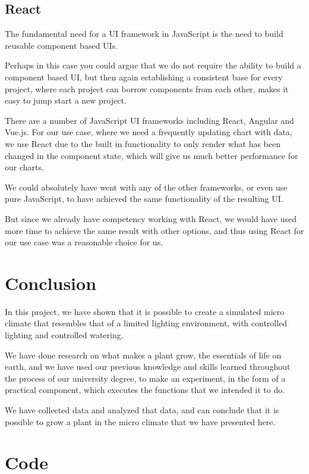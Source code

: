 \documentclass[a4paper,12pt,twoside,openright,titlepage]{book}
\begin{document}
\section{React}
The fundamental need for a UI framework in JavaScript is the need to build reusable component based UIs.

Perhaps in this case you could argue that we do not require the ability to build a component based UI, but then again establishing a consistent base for every project, where each project can borrow components from each other, makes it easy to jump start a new project.

There are a number of JavaScript UI frameworks including React, Angular and Vue.js.
For our use case, where we need a frequently updating chart with data, we use React due to the built in functionality to only render what has been changed in the component state, which will give us much better performance for our charts.

We could absolutely have went with any of the other frameworks, or even use pure JavaScript, to have achieved the same functionality of the resulting UI.

But since we already have competency working with React, we would have used more time to achieve the same result with other options, and thus using React for our use case was a reasonable choice for us.

\chapter{Conclusion}
In this project, we have shown that it is possible to create a simulated micro climate that resembles that of a limited lighting environment, with controlled lighting and controlled watering.

We have done research on what makes a plant grow, the essentials of life on earth, and we have used our previous knowledge and skills learned throughout the process of our university degree, to make an experiment, in the form of a practical component, which executes the functions that we intended it to do.

We have collected data and analyzed that data, and can conclude that it is possible to grow a plant in the micro climate that we have presented here.

\appendix
\cleardoublepage{}
\chapter{Code}
\end{document}
